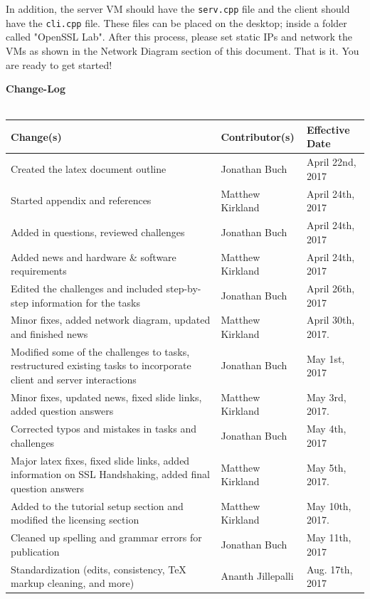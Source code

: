 \documentclass[12pt]{extarticle}
\begin{document}
In addition, the server VM should have the \texttt{serv.cpp} file and the client should have the \texttt{cli.cpp} file. These files can be placed on the desktop; inside a folder called "OpenSSL Lab". After this process, please set static IPs and network the VMs as shown in the Network Diagram section of this document. That is it. You are ready to get started!

\pagebreak

\Large{\textbf{Change-Log}}\\\\
\normalsize
\label{changelog}

\begin{tabular}{| C{5cm} | C{5cm} | C{5cm} |}
\hline
\textbf{Change(s)} & \textbf{Contributor(s)} & \textbf{Effective Date} \\
\hline
Created the latex document outline & Jonathan Buch & April 22nd, 2017 \\
\hline
Started appendix and references & Matthew Kirkland & April 24th, 2017\\
\hline
Added in questions, reviewed challenges & Jonathan Buch & April 24th, 2017 \\
\hline
Added news and hardware \& software requirements & Matthew Kirkland & April 24th, 2017\\
\hline
Edited the challenges and included step-by-step information for the tasks & Jonathan Buch & April 26th, 2017 \\
\hline
Minor fixes, added network diagram, updated and finished news & Matthew Kirkland & April 30th, 2017.\\
\hline
Modified some of the challenges to tasks, restructured existing tasks to incorporate client and server interactions & Jonathan Buch & May 1st, 2017 \\
\hline
Minor fixes, updated news, fixed slide links, added question answers & Matthew Kirkland & May 3rd, 2017.\\
\hline
Corrected typos and mistakes in tasks and challenges & Jonathan Buch & May 4th, 2017 \\
\hline
Major latex fixes, fixed slide links, added information on SSL Handshaking, added final question answers & Matthew Kirkland & May 5th, 2017.\\
\hline
Added to the tutorial setup section and modified the licensing section & Matthew Kirkland & May 10th, 2017.\\
\hline
Cleaned up spelling and grammar errors for publication & Jonathan Buch & May 11th, 2017 \\
\hline
Standardization (edits, consistency, TeX markup cleaning, and more) & Ananth Jillepalli & Aug. 17th, 2017 \\
\hline
\end{tabular}
\end{document}
